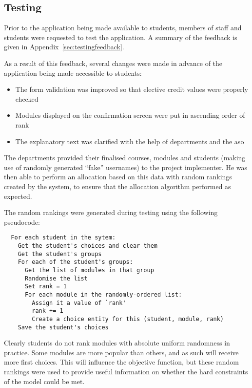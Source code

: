 
\subsection{Testing}



Prior to the application being made available to students, members of staff
and students were requested to test the application. A summary of the feedback
is given in Appendix~\ref{sec:testingfeedback}.

As a result of this feedback, several changes were made in advance of the
application being made accessible to students:

\begin{itemize}
  \item The form validation was improved so that elective credit values were properly checked
  \item Modules displayed on the confirmation screen were put in ascending order of rank
  \item The explanatory text was clarified with the help of departments and the \gls{aso}
\end{itemize}


The departments provided their finalised courses, modules and students (making
use of randomly generated ``fake'' usernames) to the project implementer. He
was then able to perform an allocation based on this data with random rankings
created by the system, to ensure that the allocation algorithm performed as
expected.

The random rankings were generated during testing using the following
pseudocode:

\begin{verbatim}
  For each student in the sytem:
    Get the student's choices and clear them
    Get the student's groups
    For each of the student's groups:
      Get the list of modules in that group
      Randomise the list
      Set rank = 1
      For each module in the randomly-ordered list:
        Assign it a value of `rank'
        rank += 1
        Create a choice entity for this (student, module, rank)
    Save the student's choices
\end{verbatim}

Clearly students do not rank modules with absolute uniform randomness in
practice. Some modules are more popular than others, and as such will receive
more first choices. This will influence the objective function, but these
random rankings were used to provide useful information on whether the hard
constraints of the model could be met.

